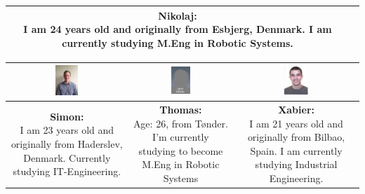 \begin{table}[h]
\begin{tabular}{|c|c|c|c|}
{} 

&

\parbox[t] {0.2\textwidth}{
\textbf{Nikolaj:} \\
I am 24 years old and originally from Esbjerg, Denmark. I am currently studying M.Eng in Robotic Systems.
} 

\\\hline
\end{tabular}

\begin{tabular}{|c|c|c|}
\hline
\includegraphics[width=0.2\textwidth]{graphics/Simon_profile} & %
\includegraphics[width=0.2\textwidth]{graphics/AnonProfile} & %
\includegraphics[width=0.2\textwidth]{graphics/sexy_xabi_profile} \\ \hline %
\parbox[t] {0.2\textwidth}{
\textbf{Simon:} \\
I am 23 years old and originally from Haderslev, Denmark. Currently studying IT-Engineering.

} 

&

\parbox[t] {0.2\textwidth}{
\textbf{Thomas:} \\
Age: 26, from Tønder. I'm currently studying to become M.Eng in Robotic Systems
} 

&

\parbox[t] {0.2\textwidth}{
\textbf{Xabier:} \\
I am 21 years old and originally from Bilbao, Spain. I am currently studying Industrial Engineering.
} 

\\\hline
\end{tabular}
\end{table}



